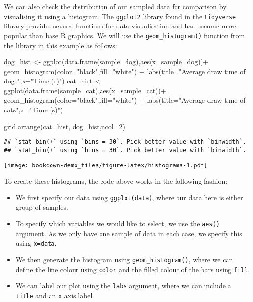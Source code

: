 \documentclass[
]{book}
\newenvironment{Shaded}{\begin{snugshade}}{\end{snugshade}}
\newcommand{\AttributeTok}[1]{\textcolor[rgb]{0.77,0.63,0.00}{#1}}
\newcommand{\DecValTok}[1]{\textcolor[rgb]{0.00,0.00,0.81}{#1}}
\newcommand{\FunctionTok}[1]{\textcolor[rgb]{0.00,0.00,0.00}{#1}}
\newcommand{\NormalTok}[1]{#1}
\newcommand{\OtherTok}[1]{\textcolor[rgb]{0.56,0.35,0.01}{#1}}
\newcommand{\SpecialCharTok}[1]{\textcolor[rgb]{0.00,0.00,0.00}{#1}}
\newcommand{\StringTok}[1]{\textcolor[rgb]{0.31,0.60,0.02}{#1}}
\providecommand{\tightlist}{%
  \setlength{\itemsep}{0pt}\setlength{\parskip}{0pt}}
\begin{document}
We can also check the distribution of our sampled data for comparison by visualising it using a histogram. The \texttt{ggplot2} library found in the \texttt{tidyverse} library provides several functions for data visualisation and has become more popular than base R graphics. We will use the \texttt{geom\_histogram()} function from the library in this example as follows:

\begin{Shaded}
\begin{Highlighting}[]
\NormalTok{dog\_hist }\OtherTok{\textless{}{-}} \FunctionTok{ggplot}\NormalTok{(}\FunctionTok{data.frame}\NormalTok{(sample\_dog),}\FunctionTok{aes}\NormalTok{(}\AttributeTok{x=}\NormalTok{sample\_dog))}\SpecialCharTok{+}
  \FunctionTok{geom\_histogram}\NormalTok{(}\AttributeTok{color=}\StringTok{"black"}\NormalTok{,}\AttributeTok{fill=}\StringTok{"white"}\NormalTok{) }\SpecialCharTok{+} 
            \FunctionTok{labs}\NormalTok{(}\AttributeTok{title=}\StringTok{"Average draw time of dogs"}\NormalTok{,}\AttributeTok{x=}\StringTok{"Time (s)"}\NormalTok{)}
\NormalTok{cat\_hist }\OtherTok{\textless{}{-}} \FunctionTok{ggplot}\NormalTok{(}\FunctionTok{data.frame}\NormalTok{(sample\_cat),}\FunctionTok{aes}\NormalTok{(}\AttributeTok{x=}\NormalTok{sample\_cat))}\SpecialCharTok{+}
  \FunctionTok{geom\_histogram}\NormalTok{(}\AttributeTok{color=}\StringTok{"black"}\NormalTok{,}\AttributeTok{fill=}\StringTok{"white"}\NormalTok{) }\SpecialCharTok{+} 
  \FunctionTok{labs}\NormalTok{(}\AttributeTok{title=}\StringTok{"Average draw time of cats"}\NormalTok{,}\AttributeTok{x=}\StringTok{"Time (s)"}\NormalTok{)}

\FunctionTok{grid.arrange}\NormalTok{(cat\_hist, dog\_hist,}\AttributeTok{ncol=}\DecValTok{2}\NormalTok{)}
\end{Highlighting}
\end{Shaded}

\begin{verbatim}
## `stat_bin()` using `bins = 30`. Pick better value with `binwidth`.
## `stat_bin()` using `bins = 30`. Pick better value with `binwidth`.
\end{verbatim}

\texttt{[image: bookdown-demo\_files/figure-latex/histograms-1.pdf]}

To create these histograms, the code above works in the following fashion:

\begin{itemize}
\tightlist
\item
  We first specify our data using \texttt{ggplot(data)}, where our data here is either group of samples.
\item
  To specify which variables we would like to select, we use the \texttt{aes()} argument. As we only have one sample of data in each case, we specify this using \texttt{x=data}.
\item
  We then generate the histogram using \texttt{geom\_histogram()}, where we can define the line colour using \texttt{color} and the filled colour of the bars using \texttt{fill}.
\item
  We can label our plot using the \texttt{labs} argument, where we can include a \texttt{title} and an \texttt{x} axis label
\end{itemize}
\end{document}
